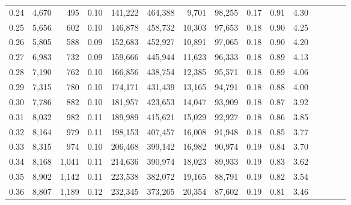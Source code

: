 \begin{tabular}{rrrcrrrrrrrrrrr}
0.24 &   4,670 &    495 &                                       0.10 &  141,222 &  464,388 &    9,701 &   98,255 &  0.17 &  0.91 &                         4.30 \\
0.25 &   5,656 &    602 &                                       0.10 &  146,878 &  458,732 &   10,303 &   97,653 &  0.18 &  0.90 &                         4.25 \\
0.26 &   5,805 &    588 &                                       0.09 &  152,683 &  452,927 &   10,891 &   97,065 &  0.18 &  0.90 &                         4.20 \\
0.27 &   6,983 &    732 &                                       0.09 &  159,666 &  445,944 &   11,623 &   96,333 &  0.18 &  0.89 &                         4.13 \\
0.28 &   7,190 &    762 &                                       0.10 &  166,856 &  438,754 &   12,385 &   95,571 &  0.18 &  0.89 &                         4.06 \\
0.29 &   7,315 &    780 &                                       0.10 &  174,171 &  431,439 &   13,165 &   94,791 &  0.18 &  0.88 &                         4.00 \\
0.30 &   7,786 &    882 &                                       0.10 &  181,957 &  423,653 &   14,047 &   93,909 &  0.18 &  0.87 &                         3.92 \\
0.31 &   8,032 &    982 &                                       0.11 &  189,989 &  415,621 &   15,029 &   92,927 &  0.18 &  0.86 &                         3.85 \\
0.32 &   8,164 &    979 &                                       0.11 &  198,153 &  407,457 &   16,008 &   91,948 &  0.18 &  0.85 &                         3.77 \\
0.33 &   8,315 &    974 &                                       0.10 &  206,468 &  399,142 &   16,982 &   90,974 &  0.19 &  0.84 &                         3.70 \\
0.34 &   8,168 &  1,041 &                                       0.11 &  214,636 &  390,974 &   18,023 &   89,933 &  0.19 &  0.83 &                         3.62 \\
0.35 &   8,902 &  1,142 &                                       0.11 &  223,538 &  382,072 &   19,165 &   88,791 &  0.19 &  0.82 &                         3.54 \\
0.36 &   8,807 &  1,189 &                                       0.12 &  232,345 &  373,265 &   20,354 &   87,602 &  0.19 &  0.81 &                         3.46 \\

\end{tabular}
